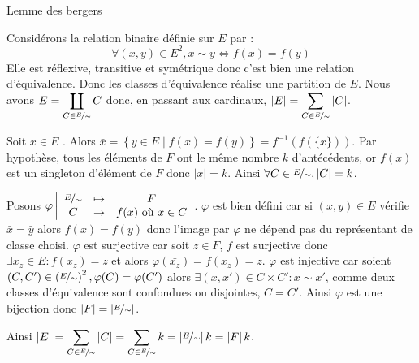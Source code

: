 \documentclass{article}
\begin{document}
	\begin{question_kholle}
		[Soient $E, F$ deux ensembles finis non vides et $f : E \rightarrow F$ telle que tout élément de $F$ possède le même nombre $k \in \N^*$ d'antécédents par $f$. \\
		Alors $\left|F\right| = \frac{\left|E\right|}{k}$
		\begin{quotation}
			\textquotedblleft Pour compter les moutons, il faut compter les pattes puis diviser par quatre. \textquotedblright
		\end{quotation}]
		{Lemme des bergers}

		Considérons la relation binaire définie sur $E$ par :
		\begin{equation*}
			\forall (x, y) \in E^2, x \sim y
			\iff f(x) = f(y)
		\end{equation*}
		Elle est réflexive, transitive et symétrique donc c'est bien une relation d'équivalence.
		Donc les classes d'équivalence réalise une partition de $E$.
		Nous avons $\displaystyle E = \coprod_{C \in \nicefrac{E}{\sim}} C$ donc, en passant aux cardinaux, $\displaystyle \left|E\right| = \sum_{C \in \nicefrac{E}{\sim}} \left|C\right|$.

		Soit $x \in E$ \fq. Alors $\bar{x} = \left\{ y \in E \;|\; f(x) = f(y) \right\} = f^{-1}(f(\{x\}))$. Par hypothèse, tous les éléments de $F$ ont le même nombre $k$ d'antécédents, or $f({x})$ est un singleton d'élément de $F$ donc $\left|\bar{x}\right| = k$.
		Ainsi $\forall C \in \nicefrac{E}{\sim}, \left|C\right| = k$.

		Posons $\varphi \left|\begin{array}{ccc}
			\nicefrac{E}{\sim} & \mapsto & F \\
			C & \rightarrow & f(x) \text{ où } x \in C
		\end{array}\right.$.
		$\varphi$ est bien défini car si $(x, y) \in E$ vérifie $\bar{x} = \bar{y}$ alors $f(x) = f(y)$ donc l'image par $\varphi$ ne dépend pas du représentant de classe choisi.
		$\varphi$ est surjective car soit $z \in F$, $f$ est surjective donc $\exists x_z \in E : f(x_z) = z$ et alors $\varphi(\bar{x_z}) = f(x_z) = z$.
		$\varphi$ est injective car soient $(C, C') \in \left( \nicefrac{E}{\sim} \right)^2, \varphi(C) = \varphi(C')$ alors $\exists (x, x') \in C \times C' : x \sim x'$, comme deux classes d'équivalence sont confondues ou disjointes, $C = C'$.
		Ainsi $\varphi$ est une bijection donc $\left|F\right| = \left|\nicefrac{E}{\sim}\right|$.

		Ainsi $\displaystyle \left|E\right| = \sum_{C \in \nicefrac{E}{\sim}} \left|C\right| = \sum_{C \in \nicefrac{E}{\sim}} k = \left| \nicefrac{E}{\sim} \right| k = \left|F\right| k$.
	\end{question_kholle}
\end{document}

